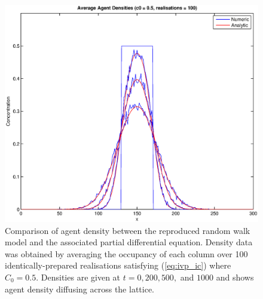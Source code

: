 \documentclass[11pt,a4paper]{article}
\begin{document}
			\begin{figure}[tbh]
				\centering
					\includegraphics[width=\textwidth]{./Figures/cell_concentration_5_100.eps}
				\caption{Comparison of agent density between the reproduced random walk model and the associated partial differential equation. Density data was obtained by averaging the occupancy of each column over 100 identically-prepared realisations satisfying (\ref{eq:ivp_ic}) where $C_0 = 0.5$. Densities are given at $t = 0, 200, 500,$ and $1000$ and shows agent density diffusing across the lattice.}
				\label{fig:cell_concentration_5_100}
			\end{figure}
\end{document}
